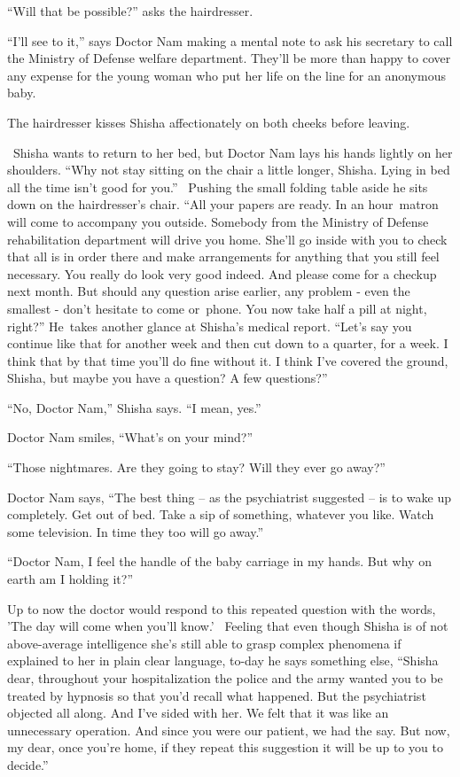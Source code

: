 \documentclass[twoside,11pt]{book}
\begin{document}
``Will that be possible?'' asks the hairdresser.

``I'll see to it,'' says Doctor Nam making a mental note to ask his secretary to call the
Ministry of Defense welfare department. They'll be more than happy to cover any expense for the young woman who put her
life on the line for an anonymous baby.

The hairdresser kisses Shisha affectionately on both cheeks before leaving.

~Shisha wants to return to her bed, but Doctor Nam lays his hands lightly on her shoulders. ``Why not stay
sitting on the chair a little longer, Shisha. Lying in bed all the time isn't good for you.'' \ Pushing
the small folding table aside he sits down on the hairdresser's chair. ``All your papers are ready. In an
hour{~}matron will come to accompany you outside. Somebody from the Ministry of Defense rehabilitation
department will drive you home. She'll go inside with you to check that all is in order there and make arrangements for
anything that you still feel necessary. You really do look very good indeed. And please come for a checkup next month.
But should any question arise earlier, any problem - even the smallest - don't hesitate to come or~phone. You now take
half a pill at night, right?'' He~takes another glance at Shisha's medical report. ``Let's
say you continue like that for another week and then cut down to a quarter{,}
for a week. I think that by that time you'll do fine without it. I think I've covered the ground, Shisha, but maybe you
have a question? A few questions?''

``No, Doctor Nam,'' Shisha says. ``I mean, yes.''

Doctor Nam smiles, ``What's on your mind?''

``Those nightmares. Are they going to stay? Will they ever go away?''

Doctor Nam says, ``The best thing -- as the psychiatrist suggested -- is to wake up completely. Get out of
bed. Take a sip of something,{ }whatever you like. Watch some television. In
time they too will go away.''

``Doctor Nam, I feel the handle of the baby carriage in my hands. But why on earth am I holding
it?''

Up to now the doctor would respond to this repeated question with the words, 'The day will come when you'll know.'
~Feeling that even though Shisha is of not above{{}-}average intelligence she's
still able to grasp complex phenomena if explained to her in plain clear language, to-day he says something else,
``Shisha dear, throughout your hospitalization the police and the army wanted you to be treated by
hypnosis so that you'd recall what happened. But the psychiatrist objected all along. And I've sided with her. We felt
that it was like an unnecessary operation. And since you were our patient, we had the say. But now, my dear, once
you're home, if they repeat this suggestion it will be up to you to decide.''
\end{document}
